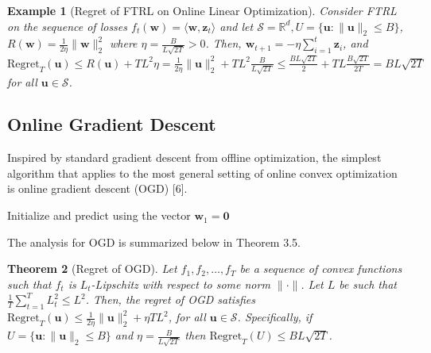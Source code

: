 \documentclass{article}
\newtheorem{theorem}{Theorem}[section]
\newtheorem{example}[theorem]{Example}
\begin{document}
\begin{example}[Regret of FTRL on Online Linear Optimization]
  Consider FTRL on the sequence of losses $f_t(\textbf{w})=\langle \textbf{w}, \textbf{z}_t\rangle$ and let $\mathcal{S}=\mathbb{R}^d, U=\{\textbf{u}:\lVert \textbf{u}\rVert_2\leq B\}$, $R(\textbf{w})=\frac{1}{2\eta}\lVert \textbf{w}\rVert_2^2$ where $\eta=\frac{B}{L\sqrt{2T}}>0$. Then, $\textbf{w}_{t+1}=-\eta \sum_{i=1}^t \textbf{z}_i$, and $\text{Regret}_T(\textbf{u})\leq R(\textbf{u})+TL^2\eta=\frac{1}{2\eta}\lVert\textbf{u}\rVert_2^2+TL^2\frac{B}{L\sqrt{2T}}\leq \frac{BL\sqrt{2T}}{2}+TL\frac{B\sqrt{2T}}{2T}=BL\sqrt{2T}$ for all $\textbf{u}\in \mathcal{S}$.
\end{example}
\subsection{Online Gradient Descent}

Inspired by standard gradient descent from offline optimization, the simplest algorithm that applies to the most general setting of online convex optimization is online gradient descent (OGD) [6].

\begin{algorithm}[H]
  \caption{Online Gradient Descent Algorithm (Zinkevich, 2003)}
  Initialize and predict using the vector $\textbf{w}_1=\textbf{0}$

\end{algorithm}

The analysis for OGD is summarized below in Theorem 3.5.

\begin{theorem}[Regret of OGD]
  Let $f_1, f_2, \ldots, f_T$ be a sequence of convex functions such that $f_t$ is $L_t$-Lipschitz with respect to some norm $\lVert \cdot \rVert$.
  Let $L$ be such that $\frac{1}{T}\sum_{t=1}^T L_t^2\leq L^2$.
  Then, the regret of OGD satisfies $\text{Regret}_T(\textbf{u})\leq \frac{1}{2\eta}\lVert \textbf{u}\rVert_2^2+\eta TL^2$, for all $\textbf{u}\in \mathcal{S}$.
  Specifically, if $U=\{\textbf{u}:\lVert \textbf{u}\rVert_2\leq B\}$ and $\eta=\frac{B}{L\sqrt{2T}}$ then $\text{Regret}_T(U)\leq BL\sqrt{2T}$.
\end{theorem}
\end{document}
